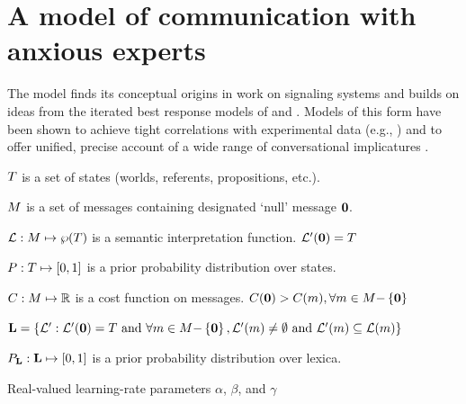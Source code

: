 \documentclass{article}
\begin{document}

\section{A model of communication with anxious experts}\label{sec:model}

The model finds its conceptual origins in  work on
signaling systems and builds on ideas from the iterated best response
models of \citet{Jaeger:2007,Jaeger:2011} and
\citet{Franke09DISS}. Models of this form have been shown to achieve
tight correlations with experimental data (e.g.,
\citealt{Frank:Goodman:2012}) and to offer unified, precise account of
a wide range of conversational implicatures
\citep{bergen-levy-goodman:2014}.

\begin{examples}
\item\label{model}
  \begin{examples}
  \item\label{states}%
    $T$ is a set of states (worlds, referents, propositions, etc.).
  \item\label{messages}%
    $M$ is a set of messages containing designated `null' message $\mathbf{0}$.
  \item\label{lex}%
    $\mathcal{L}: M \mapsto \wp(T)$ is a semantic interpretation function. 
    $\mathcal{L}'(\mathbf{0}) = T$
  \item\label{prior}%
    $P : T \mapsto [0,1]$ is a prior probability
    distribution over states.    
  \item\label{costs}%
    $C : M \mapsto \mathbb{R}$ is a cost function on messages.
    $C(\mathbf{0}) > C(m), {\forall m \in M{-}\left\{ \mathbf{0} \right\}}$
  \item\label{lexset}%
      $\mathbf{L} = \left\{ \mathcal{L}' : \mathcal{L}'(\mathbf{0}) = T \text{ and } 
      \forall m \in M{-}\left\{ \mathbf{0} \right\}, 
      \mathcal{L}'(m) \neq \emptyset \text{ and } 
      \mathcal{L}'(m) \subseteq \mathcal{L}(m) \right\}$
  \item\label{LexPrior}%
    $P_{\mathbf{L}} : \mathbf{L} \mapsto [0,1]$ is a prior
    probability distribution over lexica.
  \item\label{temps}%
    Real-valued learning-rate parameters $\alpha$, $\beta$, and
    $\gamma$
  \end{examples}
\end{examples}
\end{document}
